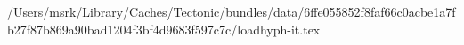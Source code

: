 /Users/msrk/Library/Caches/Tectonic/bundles/data/6ffe055852f8faf66c0acbe1a7fb27f87b869a90bad1204f3bf4d9683f597c7c/loadhyph-it.tex